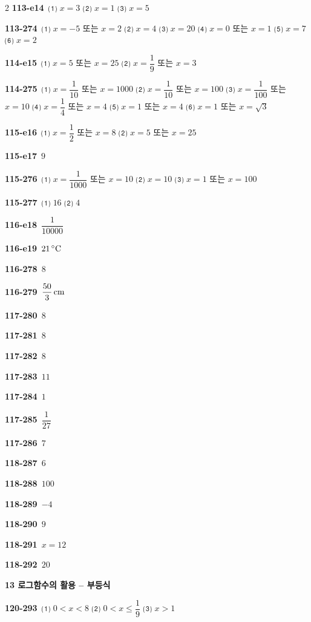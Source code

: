 \documentclass[10pt,a4paper]{article}
\begin{document}
\begin{multicols}{2}
\noindent\textbf{113-e14}\ ⑴ $x=3$ ⑵ $x=1$ ⑶ $x=5$\par
\noindent\textbf{113-274}\ ⑴ $x=-5$ 또는 $x=2$ ⑵ $x=4$ ⑶ $x=20$ ⑷ $x=0$ 또는 $x=1$ ⑸ $x=7$ ⑹ $x=2$\par
\noindent\textbf{114-e15}\ ⑴ $x=5$ 또는 $x=25$ ⑵ $x=\dfrac{1}{9}$ 또는 $x=3$\par
\noindent\textbf{114-275}\ ⑴ $x=\dfrac{1}{10}$ 또는 $x=1000$ ⑵ $x=\dfrac{1}{10}$ 또는 $x=100$ ⑶ $x=\dfrac{1}{100}$ 또는 $x=10$ ⑷ $x=\dfrac{1}{4}$ 또는 $x=4$ ⑸ $x=1$ 또는 $x=4$ ⑹ $x=1$ 또는 $x=\sqrt{3}$\par
\noindent\textbf{115-e16}\ ⑴ $x=\dfrac{1}{2}$ 또는 $x=8$ ⑵ $x=5$ 또는 $x=25$\par
\noindent\textbf{115-e17}\ $9$\par
\noindent\textbf{115-276}\ ⑴ $x=\dfrac{1}{1000}$ 또는 $x=10$ ⑵ $x=10$ ⑶ $x=1$ 또는 $x=100$\par
\noindent\textbf{115-277}\ ⑴ $16$ ⑵ $4$\par
\noindent\textbf{116-e18}\ $\dfrac{1}{10000}$\par
\noindent\textbf{116-e19}\ $21\mkern3mu ^\circ\mathrm{C}$\par
\noindent\textbf{116-278}\ $8$\par
\noindent\textbf{116-279}\ $\dfrac{50}{3}\mkern3mu \mathrm{cm}$\par
\noindent\textbf{117-280}\ $8$\par
\noindent\textbf{117-281}\ $8$\par
\noindent\textbf{117-282}\ $8$\par
\noindent\textbf{117-283}\ $11$\par
\noindent\textbf{117-284}\ $1$\par
\noindent\textbf{117-285}\ $\dfrac{1}{27}$\par
\noindent\textbf{117-286}\ $7$\par
\noindent\textbf{118-287}\ $6$\par
\noindent\textbf{118-288}\ $100$\par
\noindent\textbf{118-289}\ $-4$\par
\noindent\textbf{118-290}\ $9$\par
\noindent\textbf{118-291}\ $x=12$\par
\noindent\textbf{118-292}\ $20$\par
\noindent\textbf{13 로그함수의 활용 – 부등식}\par\smallskip
\noindent\textbf{120-293}\ ⑴ $0<x<8$ ⑵ $0<x\le\dfrac{1}{9}$ ⑶ $x>1$\par

\end{multicols}
\end{document}
